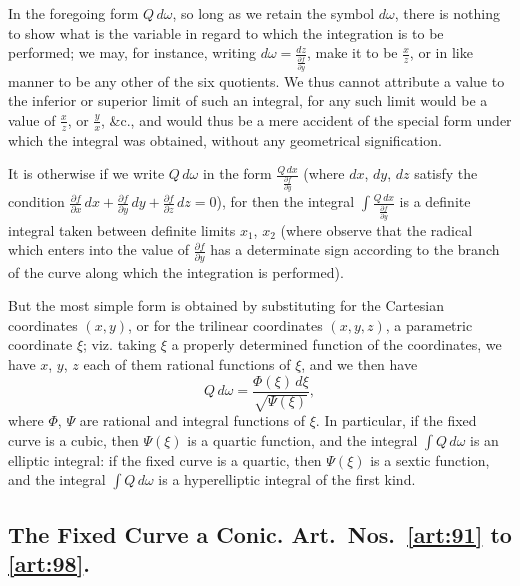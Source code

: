 \documentclass[11pt,a4paper]{book}
\begin{document}
\begin{art}\label{art:89}
In the foregoing form $Q\,d\omega$, so long as we retain the symbol $d\omega$, there is nothing to show what is the variable in regard to which the integration is to be performed; we may, for instance, writing $d\omega = \frac{dz}{\frac{\partial f}{\partial y}}$, make it to be $\frac{x}{z}$, or in like manner to be any other of the six quotients. We thus cannot attribute a value to the inferior or superior limit of such an integral, for any such limit would be a value of $\frac{x}{z}$, or $\frac{y}{x}$, \&c., and would thus be a mere accident of the special form under which the integral was obtained, without any geometrical signification.

It is otherwise if we write $Q\,d\omega$ in the form $\frac{Q\,dx}{\frac{\partial f}{\partial y}}$ (where $dx$, $dy$, $dz$ satisfy the condition $\frac{\partial f}{\partial x}\,dx + \frac{\partial f}{\partial y}\,dy + \frac{\partial f}{\partial z}\,dz = 0$), for then the integral $\int \frac{Q\,dx}{\frac{\partial f}{\partial y}}$ is a definite integral taken between definite limits $x_1$, $x_2$ (where observe that the radical which enters into the value of $\frac{\partial f}{\partial y}$ has a determinate sign according to the branch of the curve along which the integration is performed).
\end{art}

\newpage
\begin{art}\label{art:90}
But the most simple form is obtained by substituting for the Cartesian coordinates $(x, y)$, or for the trilinear coordinates $(x, y, z)$, a parametric coordinate $\xi$; viz. taking $\xi$ a properly determined function of the coordinates, we have $x$, $y$, $z$ each of them rational functions of $\xi$, and we then have
\[
Q\,d\omega = \frac{\Phi(\xi)\,d\xi}{\sqrt{\Psi(\xi)}},
\]
where $\Phi$, $\Psi$ are rational and integral functions of $\xi$. In particular, if the fixed curve is a cubic, then $\Psi(\xi)$ is a quartic function, and the integral $\int Q\,d\omega$ is an elliptic integral: if the fixed curve is a quartic, then $\Psi(\xi)$ is a sextic function, and the integral $\int Q\,d\omega$ is a hyperelliptic integral of the first kind.
\end{art}

\subsection*{The Fixed Curve a Conic. Art.~Nos.~\ref{art:91} to \ref{art:98}.}
\end{document}
